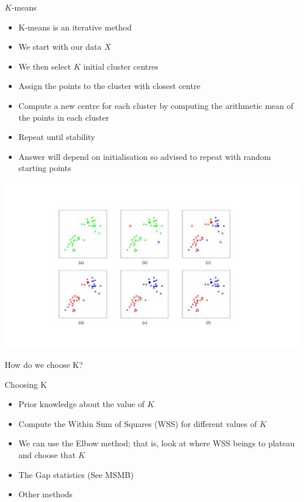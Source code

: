 \documentclass{bredelebeamer}
\begin{document}
\begin{frame}{$K$-means}
	\begin{exampleblock}
		
		\begin{itemize}
		\item K-means is an iterative method
		\item We start with our data $X$
		\item We then select $K$ initial cluster centres
		\item Assign the points to the cluster with closest centre
		\item Compute a new centre for each cluster by computing the arithmetic mean of the points in each cluster
		\item Repeat until stability
		\item Answer will depend on initialisation so advised to repeat with random starting points
		\end{itemize}

	\end{exampleblock}

\end{frame}

\begin{frame}
\includegraphics[width = 1\textwidth]{kmeans}
\end{frame}

\begin{frame}{How do we choose K?}
\begin{exampleblock}{Choosing K}
	\begin{itemize}
		\item Prior knowledge about the value of $K$
		\item Compute the Within Sum of Squares (WSS) for different values of $K$
		\item We can use the Elbow method; that is, look at where WSS beings to plateau and choose that $K$
		\item The Gap statistics (See MSMB)
		\item Other methods
	\end{itemize}
\end{exampleblock}
\end{frame}
\end{document}

